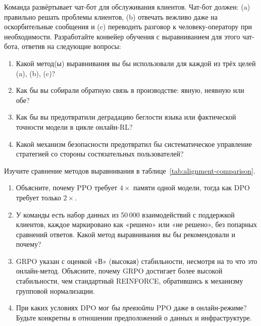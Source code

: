 \begin{exercise}
\label{ex:online-rl-design}
Команда развёртывает чат-бот для обслуживания клиентов. Чат-бот должен: (a) правильно решать проблемы клиентов, (b) отвечать вежливо даже на оскорбительные сообщения и (c) переводить разговор к человеку-оператору при необходимости. Разработайте конвейер обучения с выравниванием для этого чат-бота, ответив на следующие вопросы:
\begin{enumerate}
  \item Какой метод(ы) выравнивания вы бы использовали для каждой из трёх целей (a), (b), (c)?
  \item Как бы вы собирали обратную связь в производстве: явную, неявную или обе?
  \item Как бы вы предотвратили деградацию беглости языка или фактической точности модели в цикле онлайн-RL?
  \item Какой механизм безопасности предотвратил бы систематическое управление стратегией со стороны состязательных пользователей?
\end{enumerate}
\end{exercise}

\begin{exercise}
\label{ex:comparison-table}
Изучите сравнение методов выравнивания в таблице~\ref{tab:alignment-comparison}.
\begin{enumerate}
  \item Объясните, почему PPO требует $4\times$ памяти одной модели, тогда как DPO требует только $2\times$.
  \item У команды есть набор данных из 50\,000 взаимодействий с поддержкой клиентов, каждое маркировано как «решено» или «не решено», без попарных сравнений ответов. Какой метод выравнивания вы бы рекомендовали и почему?
  \item GRPO указан с оценкой «В» (высокая) стабильности, несмотря на то что это онлайн-метод. Объясните, почему GRPO достигает более высокой стабильности, чем стандартный REINFORCE, обратившись к механизму групповой нормализации.
  \item При каких условиях DPO мог бы \emph{превзойти} PPO даже в онлайн-режиме? Будьте конкретны в отношении предположений о данных и инфраструктуре.
\end{enumerate}
\end{exercise}

